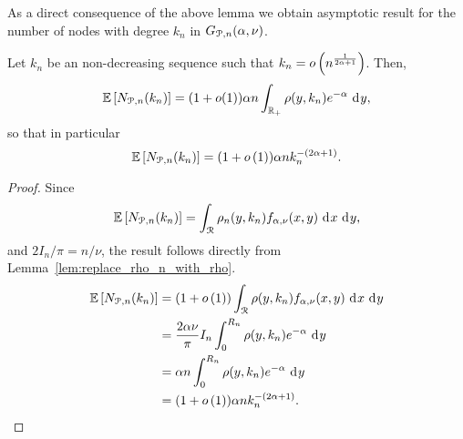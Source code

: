 
As a direct consequence of the above lemma we obtain asymptotic result for the number of nodes with degree $k_n$ in $G_{{\mathcal P},n}(\alpha,\nu)$.

\begin{lemma}\label{lem:nodes_degree_k_P_n}
Let $k_n$ be an non-decreasing sequence such that $k_n = o\left(n^{\frac{1}{2\alpha + 1}}\right)$. Then,
\[
	\mathbb{E}\left[N_{{\mathcal P},n}(k_n)\right] = (1+o(1)) \alpha n \int_{{\mathbb R}_+} \rho(y,k_n) e^{-\alpha} \operatorname{\, \mathrm{d}\hspace{-1pt}} y,
\]
so that in particular
\[
	\mathbb{E}\left[N_{{\mathcal P},n}(k_n)\right] = (1+o\left(1\right)) \alpha n k_n^{-(2\alpha + 1)}.
\]
\end{lemma}

\begin{proof}
Since
\[
	\mathbb{E}\left[N_{{\mathcal P},n}(k_n)\right] = \int_{{\mathcal R}} \rho_n(y,k_n) f_{\alpha,\nu}(x,y) \operatorname{\, \mathrm{d}\hspace{-1pt}} x \operatorname{\, \mathrm{d}\hspace{-1pt}} y,
\]
and $2 I_n/\pi = n/\nu$, the result follows directly from Lemma~\ref{lem:replace_rho_n_with_rho}.
\begin{align*}
	\mathbb{E}\left[N_{{\mathcal P},n}(k_n)\right] &= (1+o\left(1\right))\int_{{\mathcal R}} \rho(y,k_n) f_{\alpha,\nu}(x,y) \operatorname{\, \mathrm{d}\hspace{-1pt}} x \operatorname{\, \mathrm{d}\hspace{-1pt}} y\\
	&= \frac{2 \alpha \nu}{\pi} I_n \int_0^{R_n} \rho(y,k_n) e^{-\alpha} \operatorname{\, \mathrm{d}\hspace{-1pt}} y\\
	&= \alpha n \int_0^{R_n} \rho(y,k_n) e^{-\alpha} \operatorname{\, \mathrm{d}\hspace{-1pt}} y \\
	&= (1+o\left(1\right)) \alpha n k_n^{-(2\alpha + 1)}.
\end{align*}
\end{proof}


